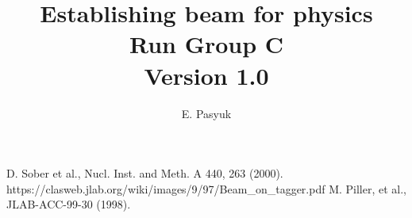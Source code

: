 \documentclass[12pt]{article}
\newcommand{\versionnumber}{1.0}
\begin{document}
\title{Establishing beam for physics \\
Run Group C\\\normalsize \vspace{3mm} Version \versionnumber}
\author{E. Pasyuk}
\maketitle


\begin{thebibliography}{00}
 D. Sober et al., Nucl. Inst. and Meth. A 440, 263 (2000).
 https://clasweb.jlab.org/wiki/images/9/97/Beam\_on\_tagger.pdf
 M. Piller, et al., JLAB-ACC-99-30 (1998).
\end{thebibliography}
\end{document}
